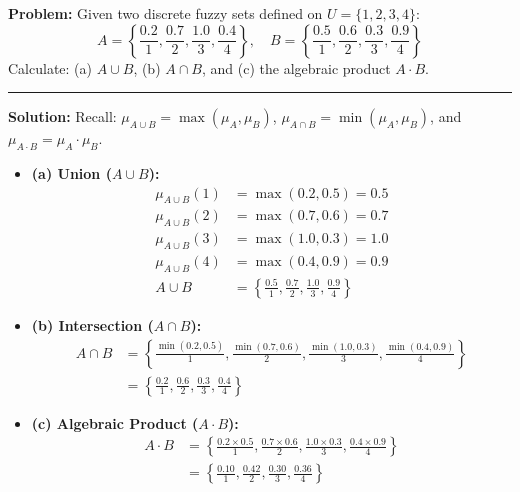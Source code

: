 \documentclass[12pt,a4paper]{article}
\begin{document}
\begin{tcolorbox}[examplebox, title={Fuzzy Set Operations}]
\textbf{Problem:} Given two discrete fuzzy sets defined on $U = \{1, 2, 3, 4\}$:
\begin{equation*}
  A = \left\{ \frac{0.2}{1}, \frac{0.7}{2}, \frac{1.0}{3}, \frac{0.4}{4} \right\}, \quad B = \left\{ \frac{0.5}{1}, \frac{0.6}{2}, \frac{0.3}{3}, \frac{0.9}{4} \right\}
\end{equation*}
Calculate: (a) $A \cup B$, (b) $A \cap B$, and (c) the algebraic product $A \cdot B$.
\par\vspace{4pt}\noindent\rule{\linewidth}{0.5pt}\par
\textbf{Solution:}
Recall: $\mu_{A \cup B} = \max(\mu_A, \mu_B)$, $\mu_{A \cap B} = \min(\mu_A, \mu_B)$, and $\mu_{A \cdot B} = \mu_A \cdot \mu_B$.
\par\vspace{4pt}
\begin{itemize}[leftmargin=*, itemsep=3.5pt]
  \item \textbf{(a) Union ($A \cup B$):}
    \begin{align*}
      \mu_{A \cup B}(1) &= \max(0.2, 0.5) = 0.5 \\
      \mu_{A \cup B}(2) &= \max(0.7, 0.6) = 0.7 \\
      \mu_{A \cup B}(3) &= \max(1.0, 0.3) = 1.0 \\
      \mu_{A \cup B}(4) &= \max(0.4, 0.9) = 0.9 \\
      A \cup B &= \left\{ \frac{0.5}{1}, \frac{0.7}{2}, \frac{1.0}{3}, \frac{0.9}{4} \right\}
    \end{align*}
    \newpage
  \item \textbf{(b) Intersection ($A \cap B$):}
    \begin{align*}
      A \cap B &= \left\{ \frac{\min(0.2,0.5)}{1}, \frac{\min(0.7,0.6)}{2}, \frac{\min(1.0,0.3)}{3}, \frac{\min(0.4,0.9)}{4} \right\} \\
      &= \left\{ \frac{0.2}{1}, \frac{0.6}{2}, \frac{0.3}{3}, \frac{0.4}{4} \right\}
    \end{align*}
  \item \textbf{(c) Algebraic Product ($A \cdot B$):}
    \begin{align*}
      A \cdot B &= \left\{ \frac{0.2 \times 0.5}{1}, \frac{0.7 \times 0.6}{2}, \frac{1.0 \times 0.3}{3}, \frac{0.4 \times 0.9}{4} \right\} \\
      &= \left\{ \frac{0.10}{1}, \frac{0.42}{2}, \frac{0.30}{3}, \frac{0.36}{4} \right\}
    \end{align*}
\end{itemize}
\end{tcolorbox}
\end{document}
